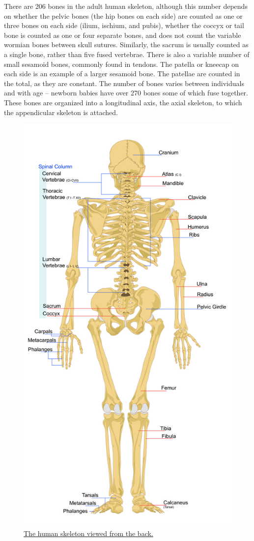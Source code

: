 There are 206 bones in the adult human skeleton, although this number depends on whether the pelvic bones (the hip bones on each side) are counted as one or three bones on each side (ilium, ischium, and pubis), whether the coccyx or tail bone is counted as one or four separate bones, and does not count the variable wormian bones between skull sutures. Similarly, the sacrum is usually counted as a single bone, rather than five fused vertebrae. There is also a variable number of small sesamoid bones, commonly found in tendons. The patella or kneecap on each side is an example of a larger sesamoid bone. The patellae are counted in the total, as they are constant. The number of bones varies between individuals and with age -- newborn babies have over 270 bones some of which fuse together. These bones are organized into a longitudinal axis, the axial skeleton, to which the appendicular skeleton is attached.



\begin{figure}

{\centering \includegraphics[width=0.7\linewidth]{./figures/locomotion/Human_skeleton_back_en} 

}

\caption{\href{https://commons.wikimedia.org/wiki/File:Human_skeleton_back_en.svg}{The human skeleton viewed from the back.}}\label{fig:humanskeletonback}
\end{figure}

